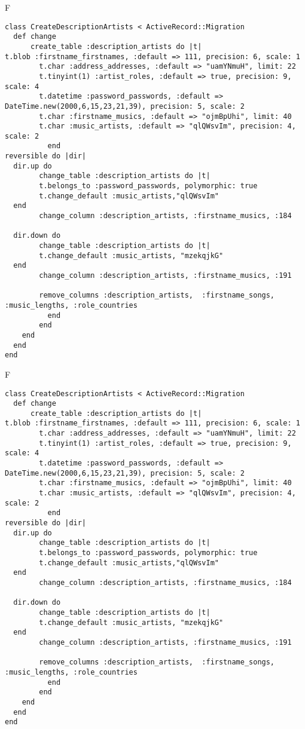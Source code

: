 F
\begin{verbatim}
class CreateDescriptionArtists < ActiveRecord::Migration
  def change
	  create_table :description_artists do |t|
t.blob :firstname_firstnames, :default => 111, precision: 6, scale: 1
		t.char :address_addresses, :default => "uamYNmuH", limit: 22
		t.tinyint(1) :artist_roles, :default => true, precision: 9, scale: 4
		t.datetime :password_passwords, :default => DateTime.new(2000,6,15,23,21,39), precision: 5, scale: 2
		t.char :firstname_musics, :default => "ojmBpUhi", limit: 40
		t.char :music_artists, :default => "qlQWsvIm", precision: 4, scale: 2
		  end
reversible do |dir|
  dir.up do
		change_table :description_artists do |t|
		t.belongs_to :password_passwords, polymorphic: true
 		t.change_default :music_artists,"qlQWsvIm"
  end
 		change_column :description_artists, :firstname_musics, :184
   
  dir.down do
		change_table :description_artists do |t|
		t.change_default :music_artists, "mzekqjkG"
  end
 		change_column :description_artists, :firstname_musics, :191
   
		remove_columns :description_artists,  :firstname_songs, :music_lengths, :role_countries 
	      end
	    end
    end 
  end
end

\end{verbatim}

F
\begin{verbatim}
class CreateDescriptionArtists < ActiveRecord::Migration
  def change
	  create_table :description_artists do |t|
t.blob :firstname_firstnames, :default => 111, precision: 6, scale: 1
		t.char :address_addresses, :default => "uamYNmuH", limit: 22
		t.tinyint(1) :artist_roles, :default => true, precision: 9, scale: 4
		t.datetime :password_passwords, :default => DateTime.new(2000,6,15,23,21,39), precision: 5, scale: 2
		t.char :firstname_musics, :default => "ojmBpUhi", limit: 40
		t.char :music_artists, :default => "qlQWsvIm", precision: 4, scale: 2
		  end
reversible do |dir|
  dir.up do
		change_table :description_artists do |t|
		t.belongs_to :password_passwords, polymorphic: true
 		t.change_default :music_artists,"qlQWsvIm"
  end
 		change_column :description_artists, :firstname_musics, :184
   
  dir.down do
		change_table :description_artists do |t|
		t.change_default :music_artists, "mzekqjkG"
  end
 		change_column :description_artists, :firstname_musics, :191
   
		remove_columns :description_artists,  :firstname_songs, :music_lengths, :role_countries 
	      end
	    end
    end 
  end
end

\end{verbatim}

